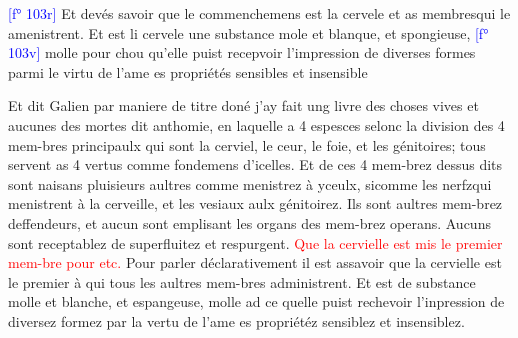 \documentclass[11pt,a4paper, twoside, openany]{memoir}
\newcommand{\folio}[1]{\textcolor{blue}{[f° #1]}}
\newcommand{\titre}[1]{\textcolor{red}{#1}}
\begin{document}
\begin{pairs}
\begin{Leftside}
\beginnumbering
\pstart
\folio{103r}
Et devés savoir que le commenchemens est la cervele
et as membresqui le amenistrent. Et est li cervele
une substance mole et blanque, et spongieuse, \folio{103v}
molle pour chou qu'elle puist recepvoir l’impression
de diverses formes parmi le virtu de l’ame es propriétés sensibles
et insensible
\pend
\endnumbering
\end{Leftside}
\begin{Rightside}
\beginnumbering
\pstart
Et dit Galien par maniere de titre doné j'ay fait ung livre des choses vives et aucunes des mortes dit anthomie, en laquelle a 4 espesces selonc la division des 4 mem-bres principaulx qui sont la cerviel, le ceur, le foie, et les génitoires; tous servent as 4 vertus comme fondemens d'icelles. Et de ces 4 mem-brez dessus dits sont naisans pluisieurs aultres comme menistrez à yceulx, sicomme les nerfzqui menistrent à la cerveille, et les vesiaux aulx génitoirez. Ils sont aultres mem-brez deffendeurs,
et aucun sont emplisant les organs des mem-brez operans.
Aucuns sont receptablez de superfluitez et respurgent.
\titre{Que la cervielle est mis le premier mem-bre pour etc.}
Pour parler déclarativement il est assavoir que la cervielle est le premier à qui tous les
aultres mem-bres administrent. Et est de substance molle
et blanche, et espangeuse, molle ad ce quelle puist rechevoir
l'inpression de diversez formez par la vertu de l'ame es
propriétéz sensiblez et insensiblez.
\pend
\endnumbering
\end{Rightside}
\end{pairs}
\Columns
\end{document}
